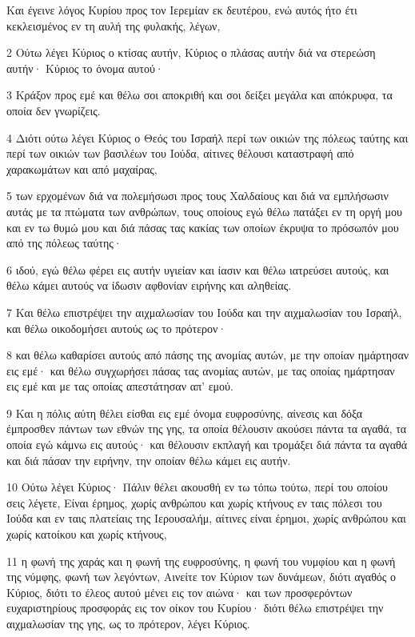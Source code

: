 \par Και έγεινε λόγος Κυρίου προς τον Ιερεμίαν εκ δευτέρου, ενώ αυτός ήτο έτι κεκλεισμένος εν τη αυλή της φυλακής, λέγων,
\par 2 Ούτω λέγει Κύριος ο κτίσας αυτήν, Κύριος ο πλάσας αυτήν διά να στερεώση αυτήν· Κύριος το όνομα αυτού·
\par 3 Κράξον προς εμέ και θέλω σοι αποκριθή και σοι δείξει μεγάλα και απόκρυφα, τα οποία δεν γνωρίζεις.
\par 4 Διότι ούτω λέγει Κύριος ο Θεός του Ισραήλ περί των οικιών της πόλεως ταύτης και περί των οικιών των βασιλέων του Ιούδα, αίτινες θέλουσι καταστραφή από χαρακωμάτων και από μαχαίρας,
\par 5 των ερχομένων διά να πολεμήσωσι προς τους Χαλδαίους και διά να εμπλήσωσιν αυτάς με τα πτώματα των ανθρώπων, τους οποίους εγώ θέλω πατάξει εν τη οργή μου και εν τω θυμώ μου και διά πάσας τας κακίας των οποίων έκρυψα το πρόσωπόν μου από της πόλεως ταύτης·
\par 6 ιδού, εγώ θέλω φέρει εις αυτήν υγιείαν και ίασιν και θέλω ιατρεύσει αυτούς, και θέλω κάμει αυτούς να ίδωσιν αφθονίαν ειρήνης και αληθείας.
\par 7 Και θέλω επιστρέψει την αιχμαλωσίαν του Ιούδα και την αιχμαλωσίαν του Ισραήλ, και θέλω οικοδομήσει αυτούς ως το πρότερον·
\par 8 και θέλω καθαρίσει αυτούς από πάσης της ανομίας αυτών, με την οποίαν ημάρτησαν εις εμέ· και θέλω συγχωρήσει πάσας τας ανομίας αυτών, με τας οποίας ημάρτησαν εις εμέ και με τας οποίας απεστάτησαν απ' εμού.
\par 9 Και η πόλις αύτη θέλει είσθαι εις εμέ όνομα ευφροσύνης, αίνεσις και δόξα έμπροσθεν πάντων των εθνών της γης, τα οποία θέλουσιν ακούσει πάντα τα αγαθά, τα οποία εγώ κάμνω εις αυτούς· και θέλουσιν εκπλαγή και τρομάξει διά πάντα τα αγαθά και διά πάσαν την ειρήνην, την οποίαν θέλω κάμει εις αυτήν.
\par 10 Ούτω λέγει Κύριος· Πάλιν θέλει ακουσθή εν τω τόπω τούτω, περί του οποίου σεις λέγετε, Είναι έρημος, χωρίς ανθρώπου και χωρίς κτήνους εν ταις πόλεσι του Ιούδα και εν ταις πλατείαις της Ιερουσαλήμ, αίτινες είναι έρημοι, χωρίς ανθρώπου και χωρίς κατοίκου και χωρίς κτήνους,
\par 11 η φωνή της χαράς και η φωνή της ευφροσύνης, η φωνή του νυμφίου και η φωνή της νύμφης, φωνή των λεγόντων, Αινείτε τον Κύριον των δυνάμεων, διότι αγαθός ο Κύριος, διότι το έλεος αυτού μένει εις τον αιώνα· και των προσφερόντων ευχαριστηρίους προσφοράς εις τον οίκον του Κυρίου· διότι θέλω επιστρέψει την αιχμαλωσίαν της γης, ως το πρότερον, λέγει Κύριος.
